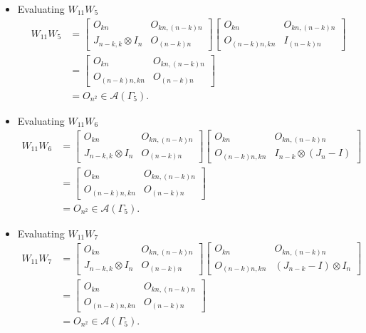 \begin{itemize}
\item Evaluating $W_{11}W_{5}$
\begin{align*}
    W_{11}W_{5}
    &= \begin{bmatrix}
        O_{kn} & O_{kn, (n-k)n} \\
        J_{n-k, k}\otimes I_n & O_{(n-k)n}
    \end{bmatrix}
    \begin{bmatrix}
        O_{kn} & O_{kn, (n-k)n} \\
        O_{(n-k)n,kn} & I_{(n-k)n}
    \end{bmatrix}\\
    &= \begin{bmatrix}
        O_{kn} & O_{kn, (n-k)n} \\
        O_{(n-k)n,kn} & O_{(n - k)n}
    \end{bmatrix}\\
    &= O_{n^2} \in\mathcal{A}(\Gamma_5).
\end{align*}

\item Evaluating $W_{11}W_{6}$
\begin{align*}
    W_{11}W_{6}
    &= \begin{bmatrix}
        O_{kn} & O_{kn, (n-k)n} \\
        J_{n-k, k}\otimes I_n & O_{(n-k)n}
    \end{bmatrix}
    \begin{bmatrix}
        O_{kn} & O_{kn, (n-k)n} \\
        O_{(n-k)n,kn} & I_{n-k} \otimes (J_n-I)
    \end{bmatrix}\\
    &= \begin{bmatrix}
        O_{kn} & O_{kn, (n-k)n} \\
        O_{(n-k)n,kn} & O_{(n - k)n}
    \end{bmatrix}\\
    &= O_{n^2} \in\mathcal{A}(\Gamma_5).
\end{align*}

\item Evaluating $W_{11}W_{7}$
\begin{align*}
    W_{11}W_{7}
    &= \begin{bmatrix}
        O_{kn} & O_{kn, (n-k)n} \\
        J_{n-k, k}\otimes I_n & O_{(n-k)n}
    \end{bmatrix}
    \begin{bmatrix}
        O_{kn} & O_{kn, (n-k)n} \\
        O_{(n-k)n,kn} & (J_{n-k}-I) \otimes I_n
    \end{bmatrix}\\
    &= \begin{bmatrix}
        O_{kn} & O_{kn, (n-k)n} \\
        O_{(n-k)n,kn} & O_{(n - k)n}
    \end{bmatrix}\\
    &= O_{n^2} \in\mathcal{A}(\Gamma_5).
\end{align*}


\end{itemize}
